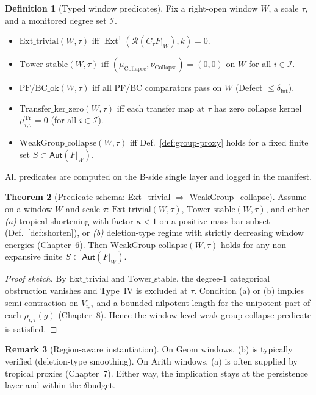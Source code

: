 \documentclass[11pt]{article}
\numberwithin{equation}{section}
\theoremstyle{plain}
\theoremstyle{definition}
\theoremstyle{remark}
\DeclareMathOperator{\Ext}{Ext}
\DeclareRobustCommand{\hyp}{\nobreakdash-}
\newcommand{\Rfun}{\mathcal{R}}
\theoremstyle{plain}
\theoremstyle{definition}
\numberwithin{equation}{section}
\newtheorem{theorem}{Theorem}[section]
\theoremstyle{definition}
\newtheorem{definition}[theorem]{Definition}
\newtheorem{remark}[theorem]{Remark}
\DeclareRobustCommand{\muc}{\mu_{\mathrm{Collapse}}}
\DeclareRobustCommand{\nuc}{\nu_{\mathrm{Collapse}}}
\numberwithin{equation}{section}
\theoremstyle{plain}
\theoremstyle{definition}
\theoremstyle{remark}
\providecommand{\muc}{\mu_{\mathrm{Collapse}}}
\providecommand{\nuc}{\nu_{\mathrm{Collapse}}}
\begin{document}
\begin{definition}[Typed window predicates]\label{def:predicates}
Fix a right\hyp open window \(W\), a scale \(\tau\), and a monitored degree set \(\mathcal{I}\).
\begin{itemize}
  \item \(\mathrm{Ext\_trivial}(W,\tau)\) iff \(\Ext^1(\Rfun(C_\tau F|_W),k)=0\).
  \item \(\mathrm{Tower\_stable}(W,\tau)\) iff \((\muc,\nuc)=(0,0)\) on \(W\) for all \(i\in\mathcal{I}\).
  \item \(\mathrm{PF/BC\_ok}(W,\tau)\) iff all PF/BC comparators pass on \(W\) (Defect \(\le \delta_{\mathrm{int}}\)).
  \item \(\mathrm{Transfer\_ker\_zero}(W,\tau)\) iff each transfer map at \(\tau\) has zero collapse kernel \(\mu^{\mathrm{Tr}}_{i,\tau}=0\) (for all \(i\in\mathcal{I}\)).
  \item \(\mathrm{WeakGroup\_collapse}(W,\tau)\) iff Def.~\ref{def:group-proxy} holds for a fixed finite set \(S\subset\mathsf{Aut}(F|_W)\).
\end{itemize}
All predicates are computed on the B\hyp side single layer and logged in the manifest.
\end{definition}

\begin{theorem}[Predicate schema: Ext\_trivial \(\Rightarrow\) WeakGroup\_collapse]\label{thm:pred-schema}
Assume on a window \(W\) and scale \(\tau\):
\(\mathrm{Ext\_trivial}(W,\tau)\),
\(\mathrm{Tower\_stable}(W,\tau)\),
and either
\emph{(a)} tropical shortening with factor \(\kappa<1\) on a positive\hyp mass bar subset (Def.~\ref{def:shorten}), or
\emph{(b)} deletion\hyp type regime with strictly decreasing window energies (Chapter~6).
Then \(\mathrm{WeakGroup\_collapse}(W,\tau)\) holds for any non\hyp expansive finite \(S\subset\mathsf{Aut}(F|_W)\).
\end{theorem}

\begin{proof}[Proof sketch]
By \(\mathrm{Ext\_trivial}\) and \(\mathrm{Tower\_stable}\), the degree\hyp \(1\) categorical obstruction vanishes and Type~IV is excluded at \(\tau\).
Condition (a) or (b) implies semi\hyp contraction on \(V_{i,\tau}\) and a bounded nilpotent length for the unipotent part of each \(\rho_{i,\tau}(g)\) (Chapter~8).
Hence the window\hyp level weak group collapse predicate is satisfied.
\end{proof}

\begin{remark}[Region\hyp aware instantiation]
On \(\mathrm{Geom}\) windows, (b) is typically verified (deletion\hyp type smoothing).
On \(\mathrm{Arith}\) windows, (a) is often supplied by tropical proxies (Chapter~7).
Either way, the implication stays at the persistence layer and within the \(\delta\)\nobreakdash budget.
\end{remark}
\end{document}
